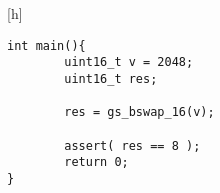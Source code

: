 \begin{minipage}{14cm}[h]
\begin{lstlisting}[style=CStyle, caption=Example of test case derived from CBMC output., label=GSLaugmentationTest]
int main(){
        uint16_t v = 2048;
        uint16_t res;

        res = gs_bswap_16(v);

        assert( res == 8 );
        return 0;
}
\end{lstlisting}
\end{minipage}
